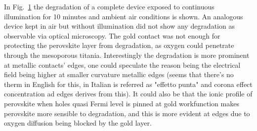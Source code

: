 		\begin{figure}%
			\label{fig:microscope_degradation}
		\end{figure}

		In Fig.~\ref{fig:microscope_degradation} the degradation of a complete device exposed to continuous illumination for 10 minutes and ambient air conditions is shown. An analogous device kept in air but without illumination did not show any degradation as observable via optical microscopy. The gold contact was not enough for protecting the perovskite layer from degradation, as oxygen could penetrate through the mesoporous titania. Interestingly the degradation is more prominent at metallic contacts' edges, one could speculate the reason being the electrical field being higher at smaller curvature metallic edges (seems that there's no therm in English for this, in Italian is referred as "effetto punta" and corona effect concentration ad edges derives from this). It could also be that the ionic profile of perovskite when holes quasi Fermi level is pinned at gold workfunction makes perovskite more sensible to degradation, and this is more evident at edges due to oxygen diffusion being blocked by the gold layer.

